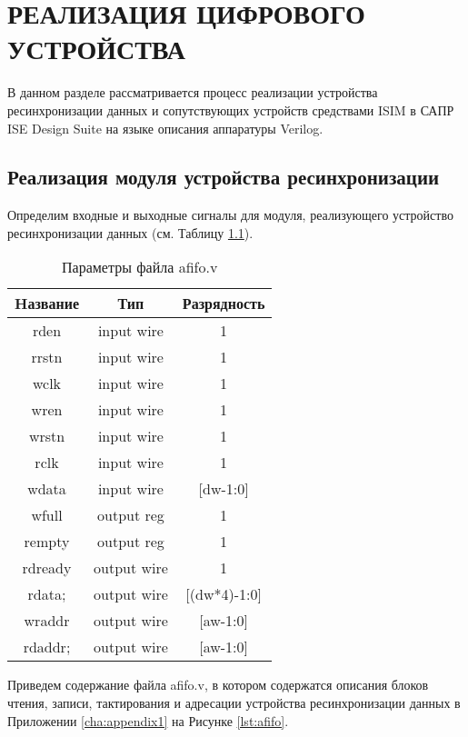 \chapter{РЕАЛИЗАЦИЯ ЦИФРОВОГО УСТРОЙСТВА}

В данном разделе рассматривается процесс реализации устройства ресинхронизации данных и сопутствующих устройств средствами ISIM в САПР ISE Design Suite на языке описания аппаратуры Verilog.

\section{Реализация модуля устройства ресинхронизации}

Определим входные и выходные сигналы для модуля, реализующего устройство ресинхронизации данных (см. Таблицу \ref{tab:afifo-params}).

\begin{table}[htbp]
	\caption{Параметры файла afifo.v}
	\centering
	\fontsize{12}{16pt}
	\begin{tabular}{|c|c|c|}
		\hline
		\multicolumn{1}{|c}{\textbf{Hазвание}}& \multicolumn{1}{|c}{\textbf{Тип}} & \multicolumn{1}{|c|}{\textbf{Разрядность}} \\ \hline
		rden & input wire & 1 \\ \hline
		rrstn & input wire & 1 \\ \hline
		wclk & input wire & 1 \\ \hline
		wren & input wire & 1 \\ \hline
		wrstn & input wire & 1 \\ \hline
		rclk & input wire & 1 \\ \hline
		wdata & input wire &   [dw-1:0]  \\ \hline
		wfull & output	  reg  & 1 \\ \hline
		rempty & output	  reg	 & 1 \\ \hline
		rdready & output    wire  & 1 \\ \hline
		rdata; & output	  wire  & [(dw*4)-1:0]  \\ \hline
		wraddr & output    wire  & [aw-1:0]  \\ \hline
		rdaddr; & output    wire  & [aw-1:0]  \\ \hline
	\end{tabular}\label{tab:afifo-params}
\end{table}

Приведем содержание файла afifo.v, в котором содержатся описания блоков чтения, записи, тактирования и адресации устройства ресинхронизации данных в Приложении \ref{cha:appendix1} на Рисунке \ref{lst:afifo}.


